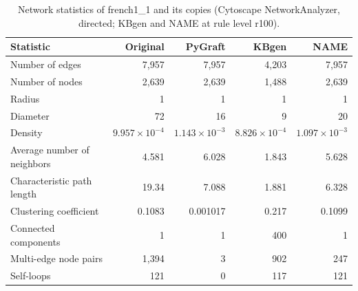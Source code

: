 \begin{table}[t]
\centering
\caption{Network statistics of french1\_1 and its copies (Cytoscape NetworkAnalyzer, directed; KBgen and NAME at rule level r100).}
\label{tab:cytoscape_french1_1}
\begin{tabular}{lrrrr}
\toprule
Statistic & Original & PyGraft & KBgen & NAME \\
\midrule
Number of edges & 7{,}957 & 7{,}957 & 4{,}203 & 7{,}957 \\
Number of nodes & 2{,}639 & 2{,}639 & 1{,}488 & 2{,}639 \\
Radius & 1 & 1 & 1 & 1 \\
Diameter & 72 & 16 & 9 & 20 \\
Density & $9.957\times10^{-4}$ & $1.143\times10^{-3}$ & $8.826\times10^{-4}$ & $1.097\times10^{-3}$ \\
Average number of neighbors & 4.581 & 6.028 & 1.843 & 5.628 \\
Characteristic path length & 19.34 & 7.088 & 1.881 & 6.328 \\
Clustering coefficient & 0.1083 & 0.001017 & 0.217 & 0.1099 \\
Connected components & 1 & 1 & 400 & 1 \\
Multi-edge node pairs & 1{,}394 & 3 & 902 & 247 \\
Self-loops & 121 & 0 & 117 & 121 \\
\bottomrule
\end{tabular}
\end{table}
